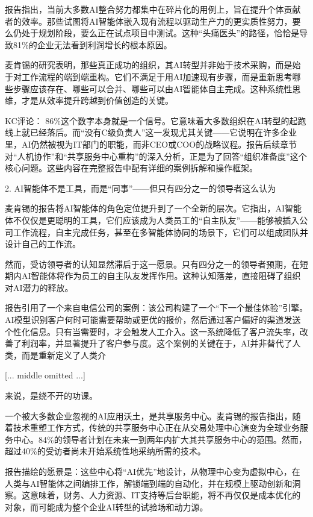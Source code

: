 \documentclass[11pt]{ctexart}
\begin{document}
报告指出，当前大多数AI整合努力都集中在碎片化的用例上，旨在提升个体贡献者的效率。那些试图将AI智能体嵌入现有流程以驱动生产力的更实质性努力，要么仍处于规划阶段，要么正在试点项目中测试。这种“头痛医头”的路径，恰恰是导致81\%的企业无法看到利润增长的根本原因。

麦肯锡的研究表明，那些真正成功的组织，其AI转型并非始于技术采购，而是始于对工作流程的端到端重构。它们不满足于用AI加速现有步骤，而是重新思考哪些步骤应该存在、哪些可以合并、哪些可以由AI智能体自主完成。这种系统性思维，才是从效率提升跨越到价值创造的关键。

KC评论： 86\%这个数字本身就是一个信号。它意味着大多数组织在AI转型的起跑线上就已经落后。而“没有C级负责人”这一发现尤其关键——它说明在许多企业里，AI仍然被视为IT部门的职能，而非CEO或COO的战略议程。报告后续章节对“人机协作”和“共享服务中心重构”的深入分析，正是为了回答“组织准备度”这个核心问题。这些内容在完整报告中配有详细的案例拆解和操作框架。

2. AI智能体不是工具，而是“同事”——但只有四分之一的领导者这么认为

麦肯锡的报告将AI智能体的角色定位提升到了一个全新的层次。它指出，AI智能体不仅仅是更聪明的工具，它们应该成为人类员工的“自主队友”——能够被插入公司工作流程，自主完成任务，甚至在多智能体协同的场景下，它们可以组成团队并设计自己的工作流。

然而，受访领导者的认知显然滞后于这一愿景。只有四分之一的领导者预期，在短期内AI智能体将作为员工的自主队友发挥作用。这种认知落差，直接阻碍了组织对AI潜力的释放。

报告引用了一个来自电信公司的案例：该公司构建了一个“下一个最佳体验”引擎。AI模型识别客户何时可能需要帮助或更优的报价，然后通过客户偏好的渠道发送个性化信息。只有当需要时，才会触发人工介入。这一系统降低了客户流失率，改善了利润率，并显著提升了客户参与度。这个案例的关键在于，AI并非替代了人类，而是重新定义了人类介

[... middle omitted ...]

来说，是绕不开的功课。

一个被大多数企业忽视的AI应用沃土，是共享服务中心。麦肯锡的报告指出，随着技术重塑工作方式，传统的共享服务中心正在从交易处理中心演变为全球业务服务中心。84\%的领导者计划在未来一到两年内扩大其共享服务中心的范围。然而，超过40\%的受访者尚未开始系统性地采纳所需的技术。

报告描绘的愿景是：这些中心将“AI优先”地设计，从物理中心变为虚拟中心，在人类与AI智能体之间编排工作，解锁端到端的自动化，并在规模上驱动创新和洞察。这意味着，财务、人力资源、IT支持等后台职能，将不再仅仅是成本优化的对象，而可能成为整个企业AI转型的试验场和动力源。
\end{document}
